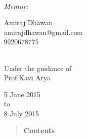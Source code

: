 \documentclass[report]{res}
\begin{document}
\begin{titlepage}
\begin{minipage}{0.4\textwidth}
		\end{minipage}
		~
		\begin{minipage}{0.4\textwidth}
			
			\begin{flushright} \large
				\emph{Mentor:} \\
			\end{flushright}
			
			\begin{flushright}
				{\large Amiraj Dhawan} \\ amirajdhawan@gmail.com \\ 9920678775
			\end{flushright}
			
		\end{minipage}\\[2cm]
		
		{ Under the guidance of\\ \large{ Prof.Kavi Arya\\[3cm]}} %
		
		
		{\large 5 June 2015  \\ to \\ 8 July 2015}\\[3cm] %
		
		
		
		
		\vfill %
		
	\end{titlepage}
	
	\begin{quote}
		\centering \textbf{\Huge Contents}
	\end{quote}
	\qquad \\ \\
	
\end{document}
